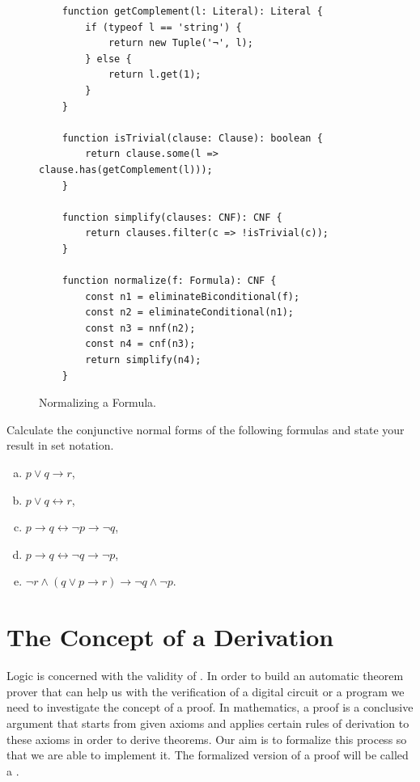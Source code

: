 \begin{figure}[!ht]
  \centering
\begin{verbatim}
    function getComplement(l: Literal): Literal {
        if (typeof l == 'string') {
            return new Tuple('¬', l);
        } else {
            return l.get(1);
        }
    }
    
    function isTrivial(clause: Clause): boolean {
        return clause.some(l => clause.has(getComplement(l)));
    }
      
    function simplify(clauses: CNF): CNF {
        return clauses.filter(c => !isTrivial(c));
    }                
  
    function normalize(f: Formula): CNF {
        const n1 = eliminateBiconditional(f);
        const n2 = eliminateConditional(n1);
        const n3 = nnf(n2);
        const n4 = cnf(n3);
        return simplify(n4);
    }
\end{verbatim} 
\vspace*{-0.3cm}
  \caption{Normalizing a Formula.}
  \label{fig:normalize}
\end{figure}
\pagebreak

\exerciseEng
Calculate the conjunctive normal forms of the following formulas and state your result in set notation.
\begin{enumerate}[(a)]
\item $p \vee q \rightarrow r$,
\item $p \vee q \leftrightarrow r$,
\item $p \rightarrow q \leftrightarrow \neg p \rightarrow \neg q$,
\item $p \rightarrow q \leftrightarrow \neg q \rightarrow \neg p$,
\item $\neg r \wedge (q \vee p \rightarrow r) \rightarrow \neg q \wedge \neg p$.
\end{enumerate}

\section{The Concept of a Derivation}
Logic is concerned with the validity of . In order to build an automatic theorem prover that can 
help us with the verification of a digital circuit or a program we need to investigate the concept of a proof.
In mathematics, a proof is a conclusive argument that starts from given axioms and applies certain rules of
derivation to these axioms in order to derive theorems.  Our aim is to formalize this process so that we are
able to implement it. The formalized version of a proof will be called a .

